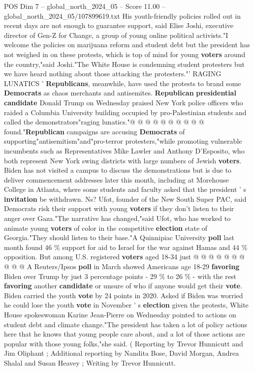 \begin{textsample}{POS Dim 7 – global\_north\_2024\_05 – Score 11.00 – global\_north\_2024\_05/107899619.txt}
His youth-friendly policies rolled out in recent days are not enough to guarantee support, said Elise Joshi, executive director of Gen-Z for Change, a group of young online political activists."I welcome the policies on marijuana reform and student debt but the president has not weighed in on these protests, which is top of mind for young \textbf{voters} around the country,"said Joshi."The White House is condemning student protesters but we have heard nothing about those attacking the protesters."' RAGING LUNATICS ' \textbf{Republicans}, meanwhile, have used the protests to brand some \textbf{Democrats} as chaos merchants and antisemites. \textbf{Republican} \textbf{presidential} \textbf{candidate} Donald Trump on Wednesday praised New York police officers who raided a Columbia University building occupied by pro-Palestinian students and called the demonstrators"raging lunatics."@ @ @ @ @ @ @ @ @ @ found."\textbf{Republican} campaigns are accusing \textbf{Democrats} of supporting"antisemitism"and"pro-terror protesters,"while promoting vulnerable incumbents such as Representatives Mike Lawler and Anthony D'Esposito, who both represent New York swing districts with large numbers of Jewish \textbf{voters}.
Biden has not visited a campus to discuss the demonstrations but is due to deliver commencement addresses later this month, including at Morehouse College in Atlanta, where some students and faculty asked that the president ' s \textbf{invitation} be withdrawn.
Ns?
Ufot, founder of the New South Super PAC, said Democrats risk their support with young \textbf{voters} if they don't listen to their anger over Gaza."The narrative has changed,"said Ufot, who has worked to animate young \textbf{voters} of color in the competitive \textbf{election} state of Georgia."They should listen to their base."A Quinnipiac University \textbf{poll} last month found 46 \% support for aid to Israel for the war against Hamas and 44 \% opposition.
But among U.S. registered \textbf{voters} aged 18-34 just @ @ @ @ @ @ @ @ @ @ A Reuters/Ipsos \textbf{poll} in March showed Americans age 18-29 \textbf{favoring} Biden over Trump by just 3 percentage points - 29 \% to 26 \% - with the rest \textbf{favoring} another \textbf{candidate} or unsure of who if anyone would get their \textbf{vote}.
Biden carried the youth \textbf{vote} by 24 points in 2020.
Asked if Biden was worried he could lose the youth \textbf{vote} in November ' s \textbf{election} given the protests, White House spokeswoman Karine Jean-Pierre on Wednesday pointed to actions on student debt and climate change."The president has taken a lot of policy actions here that he knows that young people care about, and a lot of those actions are popular with those young folks,"she said. ( Reporting by Trevor Hunnicutt and Jim Oliphant ; Additional reporting by Nandita Bose, David Morgan, Andrea Shalal and Susan Heavey ; Writing by Trevor Hunnicutt.

\end{textsample}

